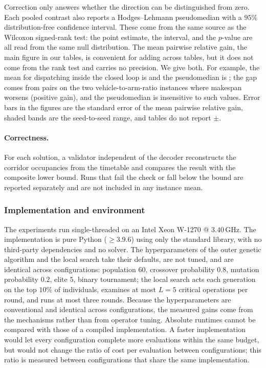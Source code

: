 Correction only answers whether the direction can be distinguished from zero. Each pooled contrast also reports a Hodges--Lehmann pseudomedian with a $95\%$ distribution-free confidence interval. These come from the same source as the Wilcoxon signed-rank test: the point estimate, the interval, and the $p$-value are all read from the same null distribution.
The mean pairwise relative gain, the main figure in our tables, is convenient for adding across tables, but it does not come from the rank test and carries no precision.
We give both. For example, the mean for dispatching inside the closed loop is \GainProbeLoop{} and the pseudomedian is \HLProbeLoop{}; the gap comes from pairs on the two vehicle-to-arm-ratio instances where makespan worsens (positive gain), and the pseudomedian is insensitive to such values.
Error bars in the figures are the standard error of the mean pairwise relative gain, shaded bands are the seed-to-seed range, and tables do not report $\pm$.

\paragraph{Correctness.}
For each solution, a validator independent of the decoder reconstructs the corridor occupancies from the timetable and compares the result with the composite lower bound.
Runs that fail the check or fall below the bound are reported separately and are not included in any instance mean.

\subsubsection{Implementation and environment}
\label{sec:impl}
The experiments run single-threaded on an Intel Xeon W-1270 @ $3.40$\,GHz. The implementation is pure Python ($\ge 3.9.6$) using only the standard library, with no third-party dependencies and no solver.
The hyperparameters of the outer genetic algorithm and the local search take their defaults, are not tuned, and are identical across configurations: population $60$, crossover probability $0.8$, mutation probability $0.2$, elite $5$, binary tournament; the local search acts each generation on the top $10\%$ of individuals, examines at most $L=5$ critical operations per round, and runs at most three rounds.
Because the hyperparameters are conventional and identical across configurations, the measured gains come from the mechanisms rather than from operator tuning.
Absolute runtimes cannot be compared with those of a compiled implementation. A faster implementation would let every configuration complete more evaluations within the same budget, but would not change the ratio of cost per evaluation between configurations; this ratio is measured between configurations that share the same implementation.

